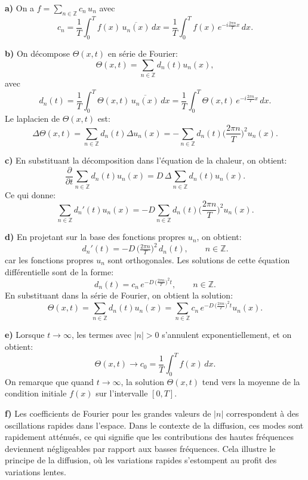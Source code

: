 \documentclass[11pt,a4paper]{article}
\numberwithin{equation}{section}
\theoremstyle{plain}
\theoremstyle{definition}
\theoremstyle{remark}
\newcommand{\Z}{\mathbb{Z}}
\newcommand{\Lap}{\Delta}
\begin{document}
\begin{solution}

    \textbf{a)} On a $f=\sum\limits_{n\in\Z} c_n \, u_n$ avec
    \[
        c_n = \frac{1}{T} \int_0^T f(x) \, \overline{u_n(x)}\,dx = \frac{1}{T} \int_0^T f(x)\, e^{-i\frac{2\pi n}{T}x}\,dx.
    \]

    \textbf{b)} On décompose $\Theta(x,t)$ en série de Fourier:
    \[
        \Theta(x,t) = \sum_{n \in \Z} d_n(t) u_n(x),
    \]
    avec
    \[
        d_n(t) = \frac{1}{T} \int_0^T \Theta(x,t) \, \overline{u_n(x)}\,dx = \frac{1}{T} \int_0^T \Theta(x,t)\, e^{-i\frac{2\pi n}{T}x}\,dx.
    \]
    Le laplacien de $\Theta(x,t)$ est:
    \[
        \Lap \Theta(x,t) = \sum_{n \in \Z} d_n(t) \Lap u_n(x) = -\sum_{n \in \Z} d_n(t) \Big(\frac{2\pi n}{T}\Big)^2 u_n(x).
    \]

    \textbf{c)} En substituant la décomposition dans l'équation de la chaleur, on obtient:
    \[
        \frac{\partial}{\partial t} \sum_{n \in \Z} d_n(t) u_n(x) = D \, \Lap \sum_{n \in \Z} d_n(t) u_n(x).
    \]
    Ce qui donne:
    \[
        \sum_{n \in \Z} d_n'(t) u_n(x) = -D \sum_{n \in \Z} d_n(t) \Big(\frac{2\pi n}{T}\Big)^2 u_n(x).
    \]

    \textbf{d)} En projetant sur la base des fonctions propres $u_n$, on obtient:
    \[
        d_n'(t) = -D\, \Big(\tfrac{2\pi n}{T}\Big)^2 \, d_n(t), \qquad n\in\Z.
    \]
    car les fonctions propres $u_n$ sont orthogonales.
    Les solutions de cette équation différentielle sont de la forme:
    \[
        d_n(t) = c_n \, e^{-D\, \Big(\tfrac{2\pi n}{T}\Big)^2 t}, \qquad n\in\Z.
    \]
    En substituant dans la série de Fourier, on obtient la solution:
    \[
        \Theta(x,t) = \sum_{n \in \Z} d_n(t) u_n(x) = \sum_{n \in \Z} c_n \, e^{-D\, \Big(\tfrac{2\pi n}{T}\Big)^2 t} u_n(x).
    \]

    \textbf{e)} Lorsque $t \to \infty$, les termes avec $|n| > 0$ s'annulent exponentiellement, et on obtient:
    \[
        \Theta(x,t) \to c_0 = \frac{1}{T} \int_0^T f(x) \, dx.
    \]
    On remarque  que quand $t \to \infty$, la solution $\Theta(x,t)$ tend vers la moyenne de la condition initiale $f(x)$ sur l'intervalle $[0,T]$.

    \textbf{f)} Les coefficients de Fourier pour les grandes valeurs de $|n|$ correspondent à des oscillations rapides dans l'espace. Dans le contexte de la diffusion, ces modes sont rapidement atténués, ce qui signifie que les contributions des hautes fréquences deviennent négligeables par rapport aux basses fréquences. Cela illustre le principe de la diffusion, où les variations rapides s'estompent au profit des variations lentes. 
\end{solution}
\end{document}
